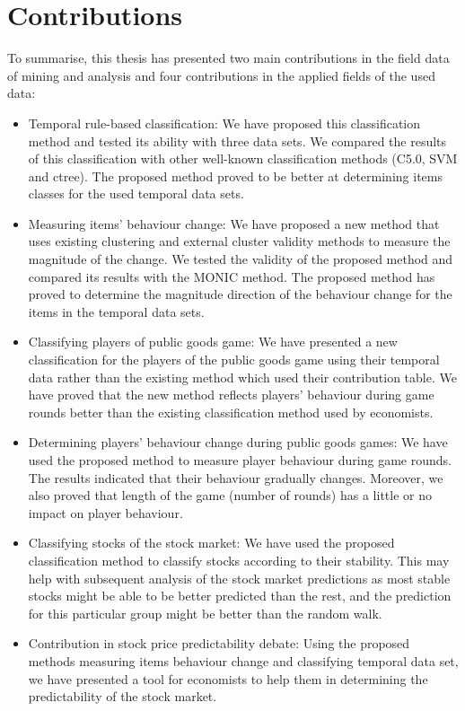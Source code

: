 \section{Contributions}
To summarise, this thesis has presented two main contributions in the field data of mining and analysis and four contributions in the applied fields of the used data: 

\begin{itemize}
    
    \item Temporal rule-based classification: We have proposed this classification method and tested its ability with three data sets. We compared the results of this classification with other well-known classification methods (C5.0, SVM and ctree). The proposed method proved to be better at determining items classes for the used temporal data sets. 
    
    \item Measuring items' behaviour change: We have proposed a new method that uses existing clustering and external cluster validity methods to measure the magnitude of the change. We tested the validity of the proposed method and compared its results with the MONIC method. The proposed method has proved to determine the magnitude direction of the behaviour change for the items in the temporal data sets. 
    
    \item Classifying players of public goods game: We have presented a new classification for the players of the public goods game using their temporal data rather than the existing method which used their contribution table. We have proved that the new method reflects players' behaviour during game rounds better than the existing classification method used by economists. 
    
    \item Determining players' behaviour change during public goods games: We have used the proposed method to measure player behaviour during game rounds. The results indicated that their behaviour gradually changes. Moreover, we also proved that length of the game (number of rounds) has a little or no impact on player behaviour. 
    
    \item Classifying stocks of the stock market: We have used the proposed classification method to classify stocks according to their stability. This may help with subsequent analysis of the stock market predictions as most stable stocks might be able to be better predicted than the rest, and the prediction for this particular group might be better than the random walk. 
    
    \item Contribution in stock price predictability debate: Using the proposed methods measuring items behaviour change and classifying temporal data set, we have presented a tool for economists to help them in determining the predictability of the stock market. 
\end{itemize}

